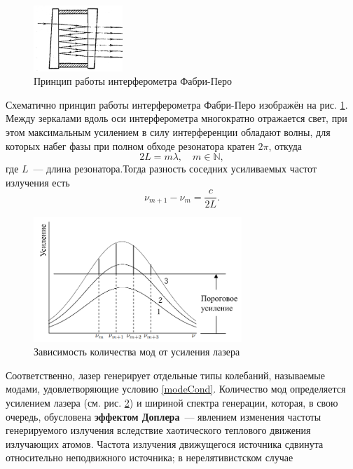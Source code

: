 \documentclass[a4paper,12pt]{article} %
\begin{document}
\begin{figure}[h]
    \centering
    \includegraphics[width=0.3\textwidth]{interfp.png}
    \caption{Принцип работы интерферометра Фабри-Перо}
    \label{fig:interfp}
\end{figure}
Схематично принцип работы интерферометра Фабри-Перо изображён на рис. \ref{fig:interfp}. Между зеркалами вдоль оси интерферометра многократно отражается свет, при этом максимальным усилением в силу интерференции обладают волны, для которых набег фазы при полном обходе резонатора кратен $2 \pi$, откуда
\begin{equation}\label{modeCond}
    2L = m\lambda,\quad m\in\mathbb{N},
\end{equation}
где $L$~--- длина резонатора.Тогда разность соседних усиливаемых частот излучения есть
\begin{equation}\label{modeDiff}
    \nu_{m+1} - \nu_m = \frac{c}{2L}.
\end{equation}
\begin{figure}[h]
    \centering
    \includegraphics[width=0.7\textwidth]{modeCount.png}
    \caption{Зависимость количества мод от усиления лазера}
    \label{fig:modeCount}
\end{figure}
Соответственно, лазер генерирует отдельные типы колебаний, называемые модами, удовлетворяющие условию \eqref{modeCond}. Количество мод определяется усилением лазера (см. рис. \ref{fig:modeCount}) и шириной спектра генерации, которая, в свою очередь, обусловена \textbf{эффектом Доплера}~--- явлением изменения частоты генерируемого излучения вследствие хаотического теплового движения излучающих атомов. Частота излучения движущегося источника сдвинута относительно неподвижного источника; в нерелятивистском случае
\end{document}
